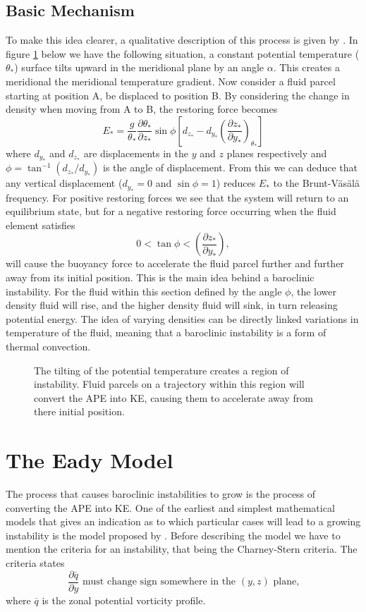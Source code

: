 \documentclass[a4paper,12pt]{article}
\begin{document}
\subsection{Basic Mechanism} 
To make this idea clearer, a qualitative description of this process is given by \cite{Pedlosky1979}. In figure \ref{pedloskyexample} below we have the following situation, a constant potential temperature ($\theta_*$) surface tilts upward in the meridional plane by an angle $\alpha$. This creates a meridional the meridional temperature gradient. Now consider a fluid parcel starting at position A, be displaced to position B. By considering the change in density when moving from A to B, the restoring force becomes  
\begin{equation}
  E_* = \frac{g}{\theta_*}\frac{\partial\theta_*}{\partial z_*}\sin\phi\left[d_{z_*}-d_{y_*}\left(\frac{\partial z_*}{\partial y_*}\right)_{\theta_*}\right]
\end{equation}
where $d_{y_*}$ and $d_{z_*}$ are displacements in the $y$ and $z$ planes respectively and $\phi=\tan^{-1}(d_{z_*}/d_{y_*})$ is the angle of displacement. From this we can deduce that any vertical displacement ($d_{y_*}=0$ and $\sin\phi = 1$) reduces $E_*$ to the Brunt-V\"as\"al\"a frequency. For positive restoring forces we see that the system will return to an equilibrium state, but for a negative restoring force occurring when the fluid element satisfies
\begin{equation}
  0 < \tan\phi < \left(\frac{\partial z_*}{\partial y_*}\right),
\end{equation}
will cause the buoyancy force to accelerate the fluid parcel further and further away from its initial position. This is the main idea behind a baroclinic instability. For the fluid within this section defined by the angle $\phi$, the lower density fluid will rise, and the higher density fluid will sink, in turn releasing potential energy. The idea of varying densities can be directly linked variations in temperature of the fluid, meaning that a baroclinic instability is a form of thermal convection.
\begin{figure}[hb]
  \centering
  
  \caption{The tilting of the potential temperature creates a region of instability. Fluid parcels on a trajectory within this region will convert the APE into KE, causing them to accelerate away from there initial position. }
  \label{pedloskyexample}
\end{figure}

\section{The Eady Model}
The process that causes baroclinic instabilities to grow is the process of converting the APE into KE. One of the earliest and simplest mathematical models that gives an indication as to which particular cases will lead to a growing instability is the model proposed by \cite{Eady1949}. Before describing the model we have to mention the criteria for an instability, that being the Charney-Stern criteria. The criteria states 
$$\frac{\partial\overline{q}}{\partial y}\text{ must change sign somewhere in the }(y,z)\text{ plane,} $$
where $\overline{q}$ is the zonal potential vorticity profile. 
\end{document}
